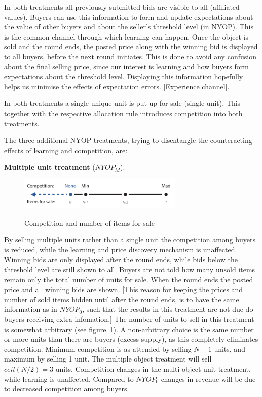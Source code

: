 \documentclass[a4paper,12pt]{article}
\begin{document}
	In both treatments all previously submitted bids are visible to all (affiliated values). Buyers can use this information to form and update expectations about the value of other buyers and about the seller's threshold level (in NYOP). This is the common channel through which learning can happen. Once the object is sold and the round ends, the posted price along with the winning bid is displayed to all buyers, before the next round initiates. This is done to avoid any confusion about the final selling price, since our interest is learning and how buyers form expectations about the threshold level. Displaying this information hopefully helps us minimise the effects of expectation errors. [Experience channel].

	In both treatments a single unique unit is put up for sale (single unit). This together with the respective allocation rule introduces competition into both treatments.

	The three additional NYOP treatments, trying to disentangle the counteracting effects of learning and competition, are:

	{\bf Multiple unit treatment} ($NYOP_M$). 
	
	\begin{figure}[h]
	        \centering
	        \caption{Competition and number of items for sale}
	        \includegraphics[width=0.7\textwidth]{Figures/Competition-Items}
			\label{fig:competition-items}
	\end{figure}
	
	By selling multiple units rather than a single unit the competition among buyers is reduced, while the learning and price discovery mechanism is unaffected. Winning bids are only displayed after the round ends, while bids below the threshold level are still shown to all. Buyers are not told how many unsold items remain only the total number of units for sale. When the round ends the posted price and all winning bids are shown. [This reason for keeping the prices and number of sold items hidden until after the round ends, is to have the same information as in $NYOP_0$, such that the results in this treatment are not due do buyers receiving extra infomation.] The number of units to sell in this treatment is somewhat arbitrary (see figure~\ref{fig:competition-items}). A non-arbitrary choice is the same number or more units than there are buyers (excess supply), as this completely eliminates competition. Minimum competition is as attended by selling $N-1$ units, and maximum by selling 1 unit. The multiple object treatment will sell $ceil(N/2)=3$ units. Competition changes in the multi object unit treatment, while learning is unaffected. Compared to $NYOP_0$ changes in revenue will be due to decreased competition among buyers.
\end{document}
